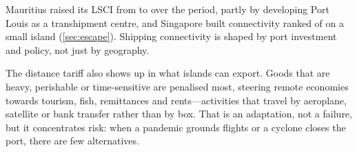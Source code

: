 \begin{counterpoint}
Mauritius raised its LSCI from \lsciMauritiusFirst{} to \lsciMauritius{} over
the period, partly by developing Port Louis as a transhipment centre, and
Singapore built connectivity ranked \lsciSingaporeRank{} of \nLsci{} on a small island
(\cref{sec:escape}). Shipping connectivity is shaped by port investment and
policy, not just by geography.
\end{counterpoint}

The distance tariff also shows up in what islands can export. Goods that are
heavy, perishable or time-sensitive are penalised most, steering remote
economies towards tourism, fish, remittances and rents---activities that
travel by aeroplane, satellite or bank transfer rather than by box. That is
an adaptation, not a failure, but it concentrates risk: when a pandemic grounds
flights or a cyclone closes the port, there are few alternatives.
